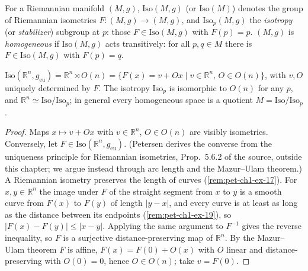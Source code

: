 \begin{definition}
  \label{def:pet-ch1-isometry-group}
  \leanok
  For a Riemannian manifold $(M,g)$, $\mathrm{Iso}(M,g)$ (or $\mathrm{Iso}(M)$)
  denotes the group of Riemannian isometries $F:(M,g)\to(M,g)$, and
  $\mathrm{Iso}_p(M,g)$ the \emph{isotropy} (or \emph{stabilizer}) subgroup at
  $p$: those $F\in\mathrm{Iso}(M,g)$ with $F(p)=p$. $(M,g)$ is \emph{homogeneous}
  if $\mathrm{Iso}(M,g)$ acts transitively: for all $p,q\in M$ there is
  $F\in\mathrm{Iso}(M,g)$ with $F(p)=q$.
\end{definition}

\begin{example}
  \label{ex:pet-ch1-isometry-group-euclidean}
  \leanok
  $\mathrm{Iso}(\mathbb{R}^n,g_{\mathrm{eu}})=\mathbb{R}^n\rtimes O(n)=\{F(x)=v+Ox\mid
  v\in\mathbb{R}^n,\,O\in O(n)\}$, with $v,O$ uniquely determined by $F$. The isotropy
  $\mathrm{Iso}_p$ is isomorphic to $O(n)$ for any $p$, and
  $\mathbb{R}^n\simeq\mathrm{Iso}/\mathrm{Iso}_p$; in general every homogeneous space is a
  quotient $M=\mathrm{Iso}/\mathrm{Iso}_p$.
\end{example}
\begin{proof}
  \leanok
  Maps $x\mapsto v+Ox$ with $v\in\mathbb{R}^n$, $O\in O(n)$ are visibly isometries.
  Conversely, let $F\in\mathrm{Iso}(\mathbb{R}^n,g_{\mathrm{eu}})$. (Petersen
  derives the converse from the uniqueness principle for Riemannian
  isometries, Prop.\ 5.6.2 of the source, outside this chapter; we argue
  instead through arc length and the Mazur--Ulam theorem.) A Riemannian
  isometry preserves the length of curves
  (\cref{rem:pet-ch1-ex-17}). For $x,y\in\mathbb{R}^n$ the image under
  $F$ of the straight segment from $x$ to $y$ is a smooth curve from $F(x)$
  to $F(y)$ of length $|y-x|$, and every curve is at least as long as the
  distance between its endpoints (\cref{rem:pet-ch1-ex-19}), so $|F(x)-F(y)|\le|x-y|$. Applying the
  same argument to $F^{-1}$ gives the reverse inequality, so $F$ is a
  surjective distance-preserving map of $\mathbb{R}^n$. By the Mazur--Ulam
  theorem $F$ is affine, $F(x)=F(0)+O(x)$ with $O$ linear and
  distance-preserving with $O(0)=0$, hence $O\in O(n)$; take $v=F(0)$.
\end{proof}

